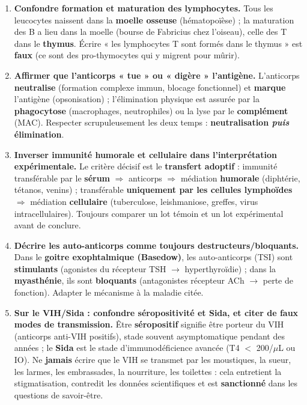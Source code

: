 \documentclass[11pt]{article}
\begin{document}
\begin{attention}
\begin{enumerate}
\item \textbf{Confondre formation et maturation des lymphocytes.} Tous les leucocytes naissent dans la \textbf{moelle osseuse} (hématopoïèse) ; la maturation des B a lieu dans la moelle (bourse de Fabricius chez l'oiseau), celle des T dans le \textbf{thymus}. Écrire « les lymphocytes T sont formés dans le thymus » est \textbf{faux} (ce sont des pro-thymocytes qui y migrent pour mûrir).
\item \textbf{Affirmer que l'anticorps « tue » ou « digère » l'antigène.} L'anticorps \textbf{neutralise} (formation complexe immun, blocage fonctionnel) et \textbf{marque} l'antigène (opsonisation) ; l'élimination physique est assurée par la \textbf{phagocytose} (macrophages, neutrophiles) ou la lyse par le \textbf{complément} (MAC). Respecter scrupuleusement les deux temps : \textbf{neutralisation \emph{puis} élimination}.
\item \textbf{Inverser immunité humorale et cellulaire dans l'interprétation expérimentale.} Le critère décisif est le \textbf{transfert adoptif} : immunité transférable par le \textbf{sérum} $\Rightarrow$ anticorps $\Rightarrow$ médiation \textbf{humorale} (diphtérie, tétanos, venins) ; transférable \textbf{uniquement par les cellules lymphoïdes} $\Rightarrow$ médiation \textbf{cellulaire} (tuberculose, leishmaniose, greffes, virus intracellulaires). Toujours comparer un lot témoin et un lot expérimental avant de conclure.
\item \textbf{Décrire les auto-anticorps comme toujours destructeurs/bloquants.} Dans le \textbf{goitre exophtalmique (Basedow)}, les auto-anticorps (TSI) sont \textbf{stimulants} (agonistes du récepteur TSH $\rightarrow$ hyperthyroïdie) ; dans la \textbf{myasthénie}, ils sont \textbf{bloquants} (antagonistes récepteur ACh $\rightarrow$ perte de fonction). Adapter le mécanisme à la maladie citée.
\item \textbf{Sur le VIH/Sida : confondre séropositivité et Sida, et citer de faux modes de transmission.} Être \textbf{séropositif} signifie être porteur du VIH (anticorps anti-VIH positifs), stade souvent asymptomatique pendant des années ; le \textbf{Sida} est le stade d'immunodéficience avancée (T4 $<$ 200/$\mu$L ou IO). Ne \textbf{jamais} écrire que le VIH se transmet par les moustiques, la sueur, les larmes, les embrassades, la nourriture, les toilettes : cela entretient la stigmatisation, contredit les données scientifiques et est \textbf{sanctionné} dans les questions de savoir-être.
\end{enumerate}
\end{attention}
\end{document}

